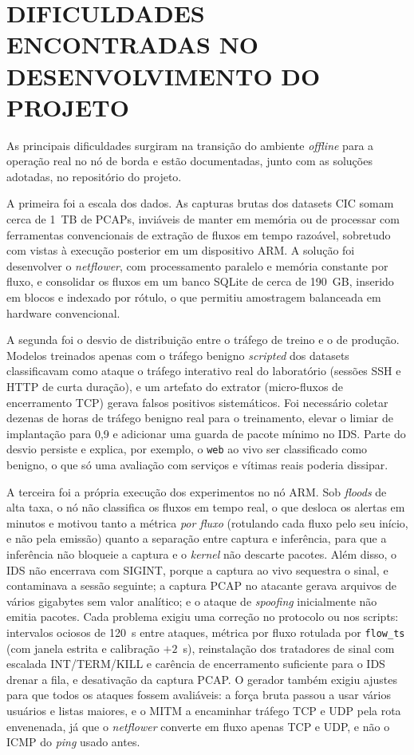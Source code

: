 \documentclass[12pt,a4paper]{article}
\begin{document}
\section{DIFICULDADES ENCONTRADAS NO DESENVOLVIMENTO DO PROJETO}
\label{sec:dificuldades}

As principais dificuldades surgiram na transição do ambiente \textit{offline}
para a operação real no nó de borda e estão documentadas, junto com as
soluções adotadas, no repositório do projeto.

A primeira foi a escala dos dados. As capturas brutas dos datasets CIC somam
cerca de 1~TB de PCAPs, inviáveis de manter em memória ou de processar com
ferramentas convencionais de extração de fluxos em tempo razoável, sobretudo
com vistas à execução posterior em um dispositivo ARM. A solução foi
desenvolver o \textit{netflower}, com processamento paralelo e memória
constante por fluxo, e consolidar os fluxos em um banco SQLite de cerca de
190~GB, inserido em blocos e indexado por rótulo, o que permitiu amostragem
balanceada em hardware convencional.

A segunda foi o desvio de distribuição entre o tráfego de treino e o de
produção. Modelos treinados apenas com o tráfego benigno \textit{scripted} dos
datasets classificavam como ataque o tráfego interativo real do laboratório
(sessões SSH e HTTP de curta duração), e um artefato do extrator (micro-fluxos
de encerramento TCP) gerava falsos positivos sistemáticos. Foi necessário
coletar dezenas de horas de tráfego benigno real para o treinamento, elevar o
limiar de implantação para 0,9 e adicionar uma guarda de pacote mínimo no IDS.
Parte do desvio persiste e explica, por exemplo, o \texttt{web} ao vivo ser
classificado como benigno, o que só uma avaliação com serviços e vítimas reais
poderia dissipar.

A terceira foi a própria execução dos experimentos no nó ARM. Sob
\textit{floods} de alta taxa, o nó não classifica os fluxos em tempo real, o que
desloca os alertas em minutos e motivou tanto a métrica \emph{por fluxo} (rotulando
cada fluxo pelo seu início, e não pela emissão) quanto a separação entre captura e
inferência, para que a inferência não bloqueie a captura e o \textit{kernel} não
descarte pacotes. Além disso, o IDS não encerrava com SIGINT, porque a captura ao
vivo sequestra o sinal, e contaminava a sessão seguinte; a captura PCAP no
atacante gerava arquivos de vários gigabytes sem valor analítico; e o ataque de
\textit{spoofing} inicialmente não emitia pacotes. Cada problema exigiu uma
correção no protocolo ou nos scripts: intervalos ociosos de 120~s entre ataques,
métrica por fluxo rotulada por \texttt{flow\_ts} (com janela estrita e calibração
$+2$~s), reinstalação dos tratadores de sinal com escalada INT/TERM/KILL e
carência de encerramento suficiente para o IDS drenar a fila, e desativação da
captura PCAP. O gerador também exigiu ajustes para que todos os ataques fossem
avaliáveis: a força bruta passou a usar vários usuários e listas maiores, e o MITM
a encaminhar tráfego TCP e UDP pela rota envenenada, já que o \textit{netflower}
converte em fluxo apenas TCP e UDP, e não o ICMP do \textit{ping} usado antes.
\end{document}
